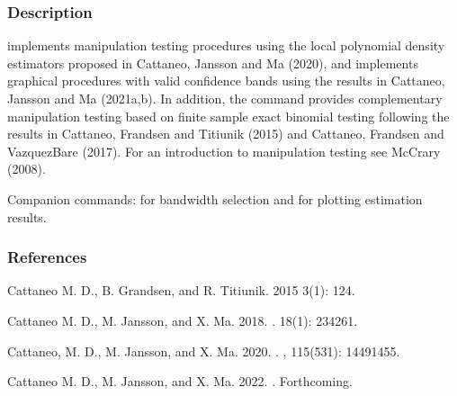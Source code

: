 \documentclass[letterpaper,10pt,english]{sphinxmanual}
\begin{document}
\subsubsection{Description}
\label{\detokenize{rddensity:description}}
\sphinxAtStartPar
{} implements manipulation testing procedures using the
local polynomial density estimators proposed in Cattaneo, Jansson and Ma (2020),
and implements graphical procedures with valid confidence bands using the results in
Cattaneo, Jansson and Ma (2021a,b).
In addition, the command provides complementary manipulation testing based on finite
sample exact binomial testing following the results in
Cattaneo, Frandsen and Titiunik (2015) and Cattaneo, Frandsen and Vazquez\sphinxhyphen{}Bare (2017).
For an introduction to manipulation testing see McCrary (2008).

\sphinxAtStartPar
Companion commands:  for bandwidth selection and  for plotting estimation results.


\subsubsection{References}
\label{\detokenize{rddensity:references}}
\sphinxAtStartPar
Cattaneo M. D., B. Grandsen, and R. Titiunik. 2015
 3(1): 1\sphinxhyphen{}24.

\sphinxAtStartPar
Cattaneo M. D., M. Jansson, and X. Ma. 2018.
.
 18(1): 234\sphinxhyphen{}261.

\sphinxAtStartPar
Cattaneo, M. D., M. Jansson, and X. Ma. 2020.
.
, 115(531): 1449\sphinxhyphen{}1455.

\sphinxAtStartPar
Cattaneo M. D., M. Jansson, and X. Ma. 2022.
.
 Forthcoming.
\end{document}
